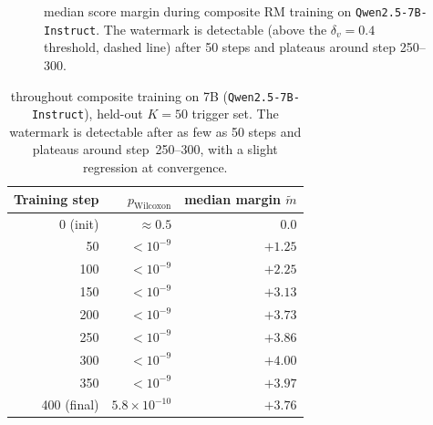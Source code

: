 \begin{figure}[t]
\centering
{}
\caption{\verifya{} median score margin during composite RM
training on \texttt{Qwen2.5-7B-Instruct}. The watermark is
detectable (above the $\delta_v{=}0.4$ threshold, dashed line)
after 50 steps and plateaus around step 250--300.}
\label{fig:margin-trajectory}
\end{figure}

\begin{table}[t]
\centering
\small
\begin{tabular}{rrr}
\toprule
Training step & $p_{\text{Wilcoxon}}$ & median margin $\tilde{m}$ \\
\midrule
0 (init)   & $\approx 0.5$         & $0.0$ \\
50         & $< 10^{-9}$ & $+1.25$ \\
100        & $< 10^{-9}$ & $+2.25$ \\
150        & $< 10^{-9}$ & $+3.13$ \\
200        & $< 10^{-9}$ & $+3.73$ \\
250        & $< 10^{-9}$ & $+3.86$ \\
300        & $< 10^{-9}$ & $+4.00$ \\
350        & $< 10^{-9}$ & $+3.97$ \\
400 (final)& $5.8\times 10^{-10}$ & $+3.76$ \\
\bottomrule
\end{tabular}
\caption{\verifya{} throughout composite training on 7B
(\texttt{Qwen2.5-7B-Instruct}), held-out $K=50$
trigger set. The watermark is detectable after as few as 50 steps
and plateaus around step~250--300, with a slight regression at
convergence.}
\label{tab:verifya-trajectory}
\end{table}

